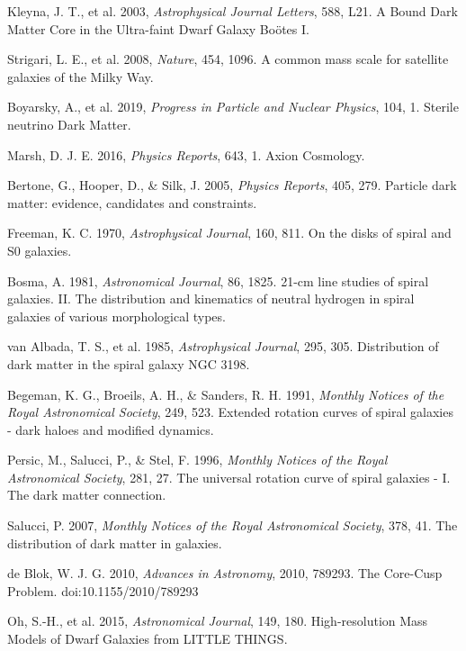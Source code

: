 \documentclass[12pt,a4paper]{article}
\begin{document}
\begin{thebibliography}{99}
 Kleyna, J. T., et al. 2003, \textit{Astrophysical Journal Letters}, 588, L21. A Bound Dark Matter Core in the Ultra-faint Dwarf Galaxy Boötes I.

 Strigari, L. E., et al. 2008, \textit{Nature}, 454, 1096. A common mass scale for satellite galaxies of the Milky Way.

 Boyarsky, A., et al. 2019, \textit{Progress in Particle and Nuclear Physics}, 104, 1. Sterile neutrino Dark Matter.

 Marsh, D. J. E. 2016, \textit{Physics Reports}, 643, 1. Axion Cosmology.

 Bertone, G., Hooper, D., \& Silk, J. 2005, \textit{Physics Reports}, 405, 279. Particle dark matter: evidence, candidates and constraints.

 Freeman, K. C. 1970, \textit{Astrophysical Journal}, 160, 811. On the disks of spiral and S0 galaxies.

 Bosma, A. 1981, \textit{Astronomical Journal}, 86, 1825. 21-cm line studies of spiral galaxies. II. The distribution and kinematics of neutral hydrogen in spiral galaxies of various morphological types.

 van Albada, T. S., et al. 1985, \textit{Astrophysical Journal}, 295, 305. Distribution of dark matter in the spiral galaxy NGC 3198.

 Begeman, K. G., Broeils, A. H., \& Sanders, R. H. 1991, \textit{Monthly Notices of the Royal Astronomical Society}, 249, 523. Extended rotation curves of spiral galaxies - dark haloes and modified dynamics.

 Persic, M., Salucci, P., \& Stel, F. 1996, \textit{Monthly Notices of the Royal Astronomical Society}, 281, 27. The universal rotation curve of spiral galaxies - I. The dark matter connection.

 Salucci, P. 2007, \textit{Monthly Notices of the Royal Astronomical Society}, 378, 41. The distribution of dark matter in galaxies.

 de Blok, W. J. G. 2010, \textit{Advances in Astronomy}, 2010, 789293. The Core-Cusp Problem. doi:10.1155/2010/789293

 Oh, S.-H., et al. 2015, \textit{Astronomical Journal}, 149, 180. High-resolution Mass Models of Dwarf Galaxies from LITTLE THINGS.


\end{thebibliography}
\end{document}
